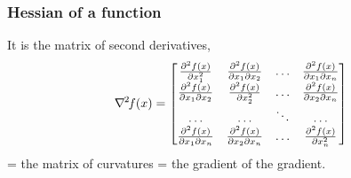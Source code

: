 \documentclass[12pt]{beamer}
\begin{document}
\begin{frame}
\frametitle{Hessian of a function} 
It is the matrix of second derivatives, 
\begin{equation*}
\nabla^{{\mkern-1mu}2}{\mkern-2mu}{f}(x) = 
\begin{bmatrix}
\frac{\partial^2 f(x)}{\partial x_1^2} & \frac{\partial^2 f(x)}{\partial x_1 \partial x_2} & \ldots & \frac{\partial^2 f(x)}{\partial x_1 \partial x_n}\\ 
\frac{\partial^2 f(x)}{\partial x_1 \partial x_2} & \frac{\partial^2 f(x)}{\partial x_2^2} & \ldots & \frac{\partial^2 f(x)}{\partial x_2 \partial x_n}\\
\ldots & \ldots & \ddots & \ldots \\
\frac{\partial^2 f(x)}{\partial x_1 \partial x_n} & \frac{\partial^2 f(x)}{\partial x_2 \partial x_n} & \ldots & \frac{\partial^2 f(x)}{\partial x_n^2}
\end{bmatrix}
\end{equation*}
= the matrix of curvatures = the gradient of the gradient.
\end{frame}
\end{document}
